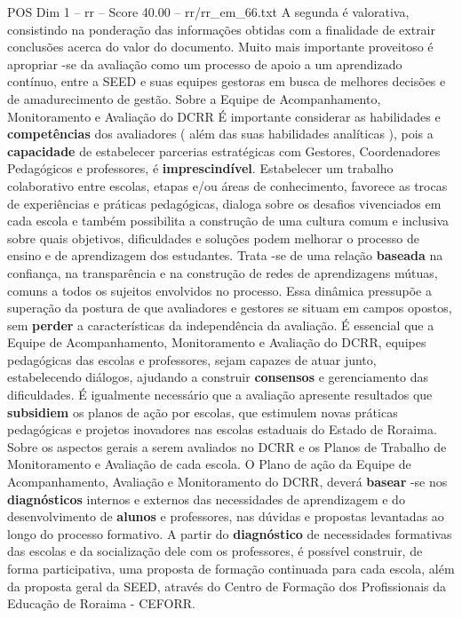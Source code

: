 \begin{textsample}{POS Dim 1 – rr – Score 40.00 – rr/rr\_em\_66.txt}
A segunda é valorativa, consistindo na ponderação das informações obtidas com a finalidade de extrair conclusões acerca do valor do documento.
Muito mais importante proveitoso é apropriar -se da avaliação como um processo de apoio a um aprendizado contínuo, entre a SEED e suas equipes gestoras em busca de melhores decisões e de amadurecimento de gestão.
Sobre a Equipe de Acompanhamento, Monitoramento e Avaliação do DCRR É importante considerar as habilidades e \textbf{competências} dos avaliadores ( além das suas habilidades analíticas ), pois a \textbf{capacidade} de estabelecer parcerias estratégicas com Gestores, Coordenadores Pedagógicos e professores, é \textbf{imprescindível}.
Estabelecer um trabalho colaborativo entre escolas, etapas e/ou áreas de conhecimento, favorece as trocas de experiências e práticas pedagógicas, dialoga sobre os desafios vivenciados em cada escola e também possibilita a construção de uma cultura comum e inclusiva sobre quais objetivos, dificuldades e soluções podem melhorar o processo de ensino e de aprendizagem dos estudantes.
Trata -se de uma relação \textbf{baseada} na confiança, na transparência e na construção de redes de aprendizagens mútuas, comuns a todos os sujeitos envolvidos no processo.
Essa dinâmica pressupõe a superação da postura de que avaliadores e gestores se situam em campos opostos, sem \textbf{perder} a características da independência da avaliação.
É essencial que a Equipe de Acompanhamento, Monitoramento e Avaliação do DCRR, equipes pedagógicas das escolas e professores, sejam capazes de atuar junto, estabelecendo diálogos, ajudando a construir \textbf{consensos} e gerenciamento das dificuldades.
É igualmente necessário que a avaliação apresente resultados que \textbf{subsidiem} os planos de ação por escolas, que estimulem novas práticas pedagógicas e projetos inovadores nas escolas estaduais do Estado de Roraima.
Sobre os aspectos gerais a serem avaliados no DCRR e os Planos de Trabalho de Monitoramento e Avaliação de cada escola.
O Plano de ação da Equipe de Acompanhamento, Avaliação e Monitoramento do DCRR, deverá \textbf{basear} -se nos \textbf{diagnósticos} internos e externos das necessidades de aprendizagem e do desenvolvimento de \textbf{alunos} e professores, nas dúvidas e propostas levantadas ao longo do processo formativo.
A partir do \textbf{diagnóstico} de necessidades formativas das escolas e da socialização dele com os professores, é possível construir, de forma participativa, uma proposta de formação continuada para cada escola, além da proposta geral da SEED, através do Centro de Formação dos Profissionais da Educação de Roraima - CEFORR.

\end{textsample}
